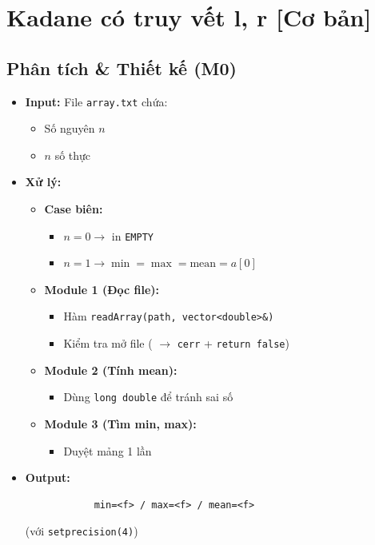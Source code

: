 \section{Kadane có truy vết l, r [Cơ bản]}
\subsection{Phân tích \& Thiết kế (M0)}
    \begin{itemize}
    \item \textbf{Input:}
    File \texttt{array.txt} chứa:
    \begin{itemize}
        \item Số nguyên $n$
        \item $n$ số thực
    \end{itemize}

    \item \textbf{Xử lý:}
        \begin{itemize}
            \item \textbf{Case biên:}
            \begin{itemize}
                \item $n = 0 \rightarrow$ in \texttt{EMPTY}
                \item $n = 1 \rightarrow \min = \max = \text{mean} = a[0]$
            \end{itemize}
            
            \item \textbf{Module 1 (Đọc file):}
            \begin{itemize}
                \item Hàm \texttt{readArray(path, vector<double>\&)}
                \item Kiểm tra mở file ( $\rightarrow$ \texttt{cerr} + \texttt{return false})
            \end{itemize}
            
            \item \textbf{Module 2 (Tính mean):}
            \begin{itemize}
                \item Dùng \texttt{long double} để tránh sai số
            \end{itemize}
            
            \item \textbf{Module 3 (Tìm min, max):}
            \begin{itemize}
                \item Duyệt mảng 1 lần
            \end{itemize}
        \end{itemize}

        \item \textbf{Output:}
        \begin{lstlisting}
            min=<f> / max=<f> / mean=<f>\end{lstlisting} 
        (với \texttt{setprecision(4)})
    \end{itemize}

